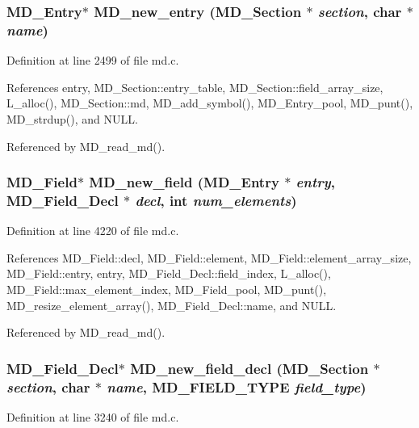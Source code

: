 \subsubsection{\setlength{\rightskip}{0pt plus 5cm}\bf{MD\_\-Entry}$\ast$ MD\_\-new\_\-entry (\bf{MD\_\-Section} $\ast$ {\em section}, char $\ast$ {\em name})}\label{md_8c_9f8fe13898aae1fcebba90fa026a3318}




Definition at line 2499 of file md.c.

References entry, MD\_\-Section::entry\_\-table, MD\_\-Section::field\_\-array\_\-size, L\_\-alloc(), MD\_\-Section::md, MD\_\-add\_\-symbol(), MD\_\-Entry\_\-pool, MD\_\-punt(), MD\_\-strdup(), and NULL.

Referenced by MD\_\-read\_\-md().
\subsubsection{\setlength{\rightskip}{0pt plus 5cm}\bf{MD\_\-Field}$\ast$ MD\_\-new\_\-field (\bf{MD\_\-Entry} $\ast$ {\em entry}, \bf{MD\_\-Field\_\-Decl} $\ast$ {\em decl}, int {\em num\_\-elements})}\label{md_8c_fbc882977f12979165e7d5903d2272be}




Definition at line 4220 of file md.c.

References MD\_\-Field::decl, MD\_\-Field::element, MD\_\-Field::element\_\-array\_\-size, MD\_\-Field::entry, entry, MD\_\-Field\_\-Decl::field\_\-index, L\_\-alloc(), MD\_\-Field::max\_\-element\_\-index, MD\_\-Field\_\-pool, MD\_\-punt(), MD\_\-resize\_\-element\_\-array(), MD\_\-Field\_\-Decl::name, and NULL.

Referenced by MD\_\-read\_\-md().
\subsubsection{\setlength{\rightskip}{0pt plus 5cm}\bf{MD\_\-Field\_\-Decl}$\ast$ MD\_\-new\_\-field\_\-decl (\bf{MD\_\-Section} $\ast$ {\em section}, char $\ast$ {\em name}, \bf{MD\_\-FIELD\_\-TYPE} {\em field\_\-type})}\label{md_8c_dbb60e2a637334eb1c028ae19d8fd7a6}




Definition at line 3240 of file md.c.

